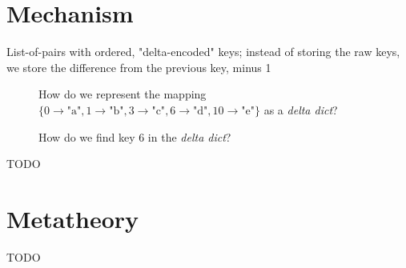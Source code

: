 \documentclass[nonacm]{acmart}
\newcommand{\dd}{\emph{delta dict}}
\newcommand{\mapP}{\{0 \rightarrow \text{"a"}, 1 \rightarrow \text{"b"}, 3 \rightarrow \text{"c"}, 6 \rightarrow \text{"d"}, 10 \rightarrow \text{"e"}\}}
\theoremstyle{slplain}
\numberwithin{thm}{section}
\begin{document}

\section{Mechanism}
\label{sec:Mechanism}
List-of-pairs with ordered, "delta-encoded" keys;
instead of storing the raw keys, we store
the difference from the previous key, minus 1
\begin{figure}[H]
  \centering
  \caption{How do we represent the mapping $\mapP$ as a \dd?}
  \label{fig:mech1}
\end{figure}
\begin{figure}[H]
  \centering
  \caption{How do we find key $6$ in the \dd?}
  \label{fig:find-6}
\end{figure}

TODO

\section{Metatheory}
\label{sec:Metatheory}
TODO
\end{document}
